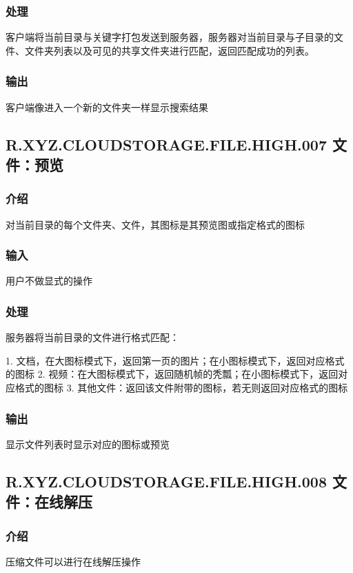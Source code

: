 \subsubsection{处理} 
客户端将当前目录与关键字打包发送到服务器，服务器对当前目录与子目录的文件、文件夹列表以及可见的共享文件夹进行匹配，返回匹配成功的列表。

\subsubsection{输出} 
客户端像进入一个新的文件夹一样显示搜索结果

\subsection{R.XYZ.CLOUDSTORAGE.FILE.HIGH.007 文件：预览}

\subsubsection{介绍}
对当前目录的每个文件夹、文件，其图标是其预览图或指定格式的图标

\subsubsection{输入} 
用户不做显式的操作
\subsubsection{处理} 
服务器将当前目录的文件进行格式匹配：

1. 文档，在大图标模式下，返回第一页的图片；在小图标模式下，返回对应格式的图标
2. 视频：在大图标模式下，返回随机帧的秃瓢；在小图标模式下，返回对应格式的图标
3. 其他文件：返回该文件附带的图标，若无则返回对应格式的图标

\subsubsection{输出} 
显示文件列表时显示对应的图标或预览


\subsection{R.XYZ.CLOUDSTORAGE.FILE.HIGH.008 文件：在线解压}

\subsubsection{介绍}
压缩文件可以进行在线解压操作

